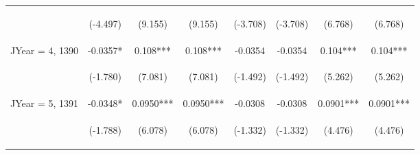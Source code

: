 \documentclass[]{article}
\begin{document}
\begin{center}
\begin{tabular}{lccccccc}
\vspace{4pt} & \begin{footnotesize}(-4.497)\end{footnotesize} & \begin{footnotesize}(9.155)\end{footnotesize} & \begin{footnotesize}(9.155)\end{footnotesize} & \begin{footnotesize}(-3.708)\end{footnotesize} & \begin{footnotesize}(-3.708)\end{footnotesize} & \begin{footnotesize}(6.768)\end{footnotesize} & \begin{footnotesize}(6.768)\end{footnotesize} \\
JYear = 4, 1390 & -0.0357* & 0.108*** & 0.108*** & -0.0354 & -0.0354 & 0.104*** & 0.104*** \\
\vspace{4pt} & \begin{footnotesize}(-1.780)\end{footnotesize} & \begin{footnotesize}(7.081)\end{footnotesize} & \begin{footnotesize}(7.081)\end{footnotesize} & \begin{footnotesize}(-1.492)\end{footnotesize} & \begin{footnotesize}(-1.492)\end{footnotesize} & \begin{footnotesize}(5.262)\end{footnotesize} & \begin{footnotesize}(5.262)\end{footnotesize} \\
JYear = 5, 1391 & -0.0348* & 0.0950*** & 0.0950*** & -0.0308 & -0.0308 & 0.0901*** & 0.0901*** \\
\vspace{4pt} & \begin{footnotesize}(-1.788)\end{footnotesize} & \begin{footnotesize}(6.078)\end{footnotesize} & \begin{footnotesize}(6.078)\end{footnotesize} & \begin{footnotesize}(-1.332)\end{footnotesize} & \begin{footnotesize}(-1.332)\end{footnotesize} & \begin{footnotesize}(4.476)\end{footnotesize} & \begin{footnotesize}(4.476)\end{footnotesize} \\

\end{tabular}
\end{center}
\end{document}

